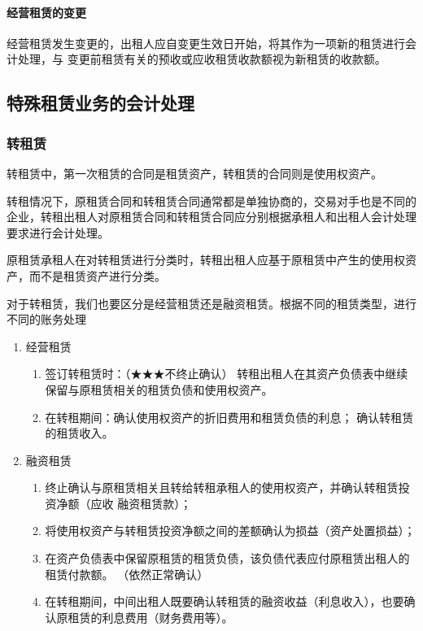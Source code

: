 \documentclass[UTF8,12pt]{ctexart}
\numberwithin{equation}{section} %
\numberwithin{figure}{section}
\numberwithin{table}{section}
\begin{document}
	
	\paragraph{经营租赁的变更}经营租赁发生变更的，出租人应自变更生效日开始，将其作为一项新的租赁进行会计处理，与   变更前租赁有关的预收或应收租赁收款额视为新租赁的收款额。
	
	\subsection{特殊租赁业务的会计处理}
	\subsubsection{转租赁}
	转租赁中，第一次租赁的合同是租赁资产，转租赁的合同则是使用权资产。
	
	转租情况下，原租赁合同和转租赁合同通常都是单独协商的，交易对手也是不同的企业，转租出租人对原租赁合同和转租赁合同应分别根据承租人和出租人会计处理要求进行会计处理。
	
	原租赁承租人在对转租赁进行分类时，转租出租人应基于原租赁中产生的使用权资产，而不是租赁资产进行分类。
	
	对于转租赁，我们也要区分是经营租赁还是融资租赁。根据不同的租赁类型，进行不同的账务处理
	\begin{enumerate}
		\item 经营租赁
		\begin{enumerate}
			\item 签订转租赁时：（★★★不终止确认）
			转租出租人在其资产负债表中继续保留与原租赁相关的租赁负债和使用权资产。
			\item 在转租期间：确认使用权资产的折旧费用和租赁负债的利息；	确认转租赁的租赁收入。
		\end{enumerate}
		
		\item 融资租赁
		\begin{enumerate}
			\item 终止确认与原租赁相关且转给转租承租人的使用权资产，并确认转租赁投资净额（应收   融资租赁款）；
			\item 将使用权资产与转租赁投资净额之间的差额确认为损益（资产处置损益）；
			\item 在资产负债表中保留原租赁的租赁负债，该负债代表应付原租赁出租人的租赁付款额。
			（依然正常确认）
			\item 在转租期间，中间出租人既要确认转租赁的融资收益（利息收入），也要确认原租赁的利息费用（财务费用等）。
		\end{enumerate}
	\end{enumerate}
\end{document}
